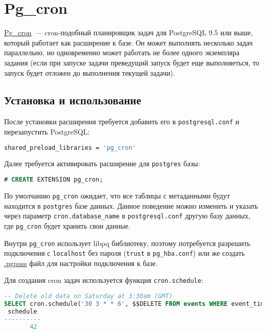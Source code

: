 \section{Pg\_cron}

\href{https://github.com/citusdata/pg\_cron}{Pg\_cron}~--- cron-подобный планировщик задач для PostgreSQL 9.5 или выше, который работает как расширение к базе. Он может выполнять несколько задач параллельно, но одновременно может работать не более одного экземпляра задания (если при запуске задачи преведущий запуск будет еще выполняеться, то запуск будет отложен до выполнения текущей задачи).

\subsection{Установка и использование}

После установки расширения требуется добавить его в \lstinline!postgresql.conf! и перезапустить PostgreSQL:

\begin{lstlisting}[language=Bash,label=lst:pgcron1,caption=pg\_cron]
shared_preload_libraries = 'pg_cron'
\end{lstlisting}

Далее требуется активировать расширение для \lstinline!postgres! базы:

\begin{lstlisting}[language=SQL,label=lst:pgcron2,caption=pg\_cron]
# CREATE EXTENSION pg_cron;
\end{lstlisting}

По умолчанию \lstinline!pg_cron! ожидает, что все таблицы с метаданными будут находится в \lstinline!postgres! базе данных. Данное поведение можно изменить и указать через параметр \lstinline!cron.database_name! в \lstinline!postgresql.conf! другую базу данных, где \lstinline!pg_cron! будет хранить свои данные.

Внутри \lstinline!pg_cron! использует libpq библиотеку, поэтому потребуется разрешить подключения с \lstinline!localhost! без пароля (\lstinline!trust! в \lstinline!pg_hba.conf!) или же создать \href{https://www.postgresql.org/docs/current/static/libpq-pgpass.html}{.pgpass} файл для настройки подключения к базе.

Для создания cron задач используется функция \lstinline!cron.schedule!:

\begin{lstlisting}[language=SQL,label=lst:pgcron3,caption=Cron.schedule]
-- Delete old data on Saturday at 3:30am (GMT)
SELECT cron.schedule('30 3 * * 6', $$DELETE FROM events WHERE event_time < now() - interval '1 week'$$);
 schedule
----------
       42
\end{lstlisting}

